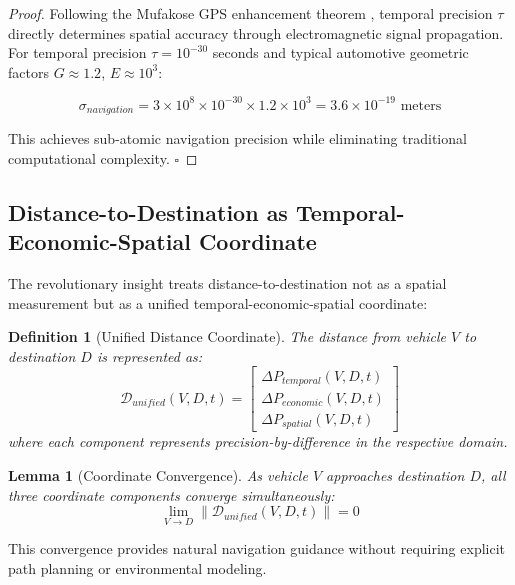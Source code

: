 \documentclass[12pt,a4paper]{article}
\newtheorem{lemma}[theorem]{Lemma}
\newtheorem{definition}[theorem]{Definition}
\begin{document}
\begin{proof}
Following the Mufakose GPS enhancement theorem \citep{sachikonye2025mufakose}, temporal precision $\tau$ directly determines spatial accuracy through electromagnetic signal propagation. For temporal precision $\tau = 10^{-30}$ seconds and typical automotive geometric factors $G \approx 1.2$, $E \approx 10^3$:

\begin{equation}
\sigma_{navigation} = 3 \times 10^8 \times 10^{-30} \times 1.2 \times 10^3 = 3.6 \times 10^{-19} \text{ meters}
\end{equation}

This achieves sub-atomic navigation precision while eliminating traditional computational complexity. $\square$
\end{proof}

\subsection{Distance-to-Destination as Temporal-Economic-Spatial Coordinate}

The revolutionary insight treats distance-to-destination not as a spatial measurement but as a unified temporal-economic-spatial coordinate:

\begin{definition}[Unified Distance Coordinate]
The distance from vehicle $V$ to destination $D$ is represented as:
\begin{equation}
\mathcal{D}_{unified}(V,D,t) = \begin{bmatrix}
\Delta P_{temporal}(V,D,t) \\
\Delta P_{economic}(V,D,t) \\
\Delta P_{spatial}(V,D,t)
\end{bmatrix}
\end{equation}
where each component represents precision-by-difference in the respective domain.
\end{definition}

\begin{lemma}[Coordinate Convergence]
As vehicle $V$ approaches destination $D$, all three coordinate components converge simultaneously:
\begin{equation}
\lim_{V \rightarrow D} \|\mathcal{D}_{unified}(V,D,t)\| = 0
\end{equation}
\end{lemma}

This convergence provides natural navigation guidance without requiring explicit path planning or environmental modeling.
\end{document}

